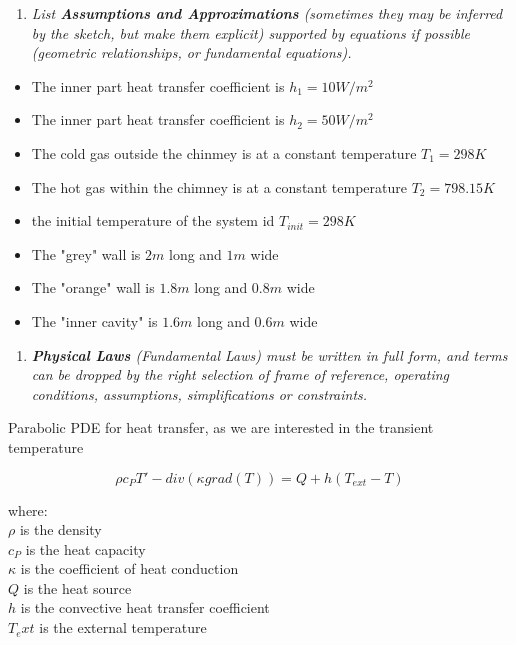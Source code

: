 \documentclass{article}
\begin{document}
\begin{enumerate}[resume]
\item \textit{List \textbf{Assumptions and Approximations} (sometimes they may be inferred by the sketch, but make them explicit) supported by equations if possible (geometric relationships, or fundamental equations).}
\end{enumerate}

\begin{itemize}
\item The inner part heat transfer coefficient is $h_1 = 10 W/m^2$
\item The inner part heat transfer coefficient is $h_2 = 50 W/m^2$
\item The cold gas outside the chinmey is at a constant temperature $T_1 = 298 K$
\item The hot gas within the chimney is at a constant temperature $T_2 = 798.15 K$
\item the initial temperature of the system id $T_{init} = 298 K$
\item The "grey" wall is $2m$ long and $1m$ wide
\item The "orange" wall is $1.8m$ long and $0.8m$ wide
\item The "inner cavity" is $1.6m$ long and $0.6m$ wide
\end{itemize}

\begin{enumerate}[resume]
\item \textit{\textbf{Physical Laws} (Fundamental Laws) must be written in full form, and terms can be dropped by the right selection of frame of reference, operating conditions, assumptions, simplifications or constraints.}
\end{enumerate}

Parabolic PDE for heat transfer, as we are interested in the transient temperature

\begin{equation}
\rho c_P T' - div \left( \kappa grad(T) \right) = Q + h (T_{ext} - T)
\label{eq_heatTransfer}
\end{equation}

where: \\
$\rho$ is the density \\
$c_P$ is the heat capacity \\
$\kappa$ is the coefficient of heat conduction \\
$Q$ is the heat source \\
$h$ is the convective heat transfer coefficient \\
$T_ext$ is the external temperature 
\end{document}
